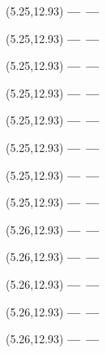 \documentclass[12pt,a4paper]{article}
\begin{document}
\begin{textblock}{3}(5.25,12.93)
{\bf ---}\quad\quad\ {\bf ---}
\end{textblock}
\newpage

\begin{textblock}{3}(5.25,12.93)
{\bf ---}\quad\quad\ {\bf ---}
\end{textblock}
\newpage

\begin{textblock}{3}(5.25,12.93)
{\bf ---}\quad\quad\ {\bf ---}
\end{textblock}
\newpage

\begin{textblock}{3}(5.25,12.93)
{\bf ---}\quad\quad\ {\bf ---}
\end{textblock}
\newpage

\begin{textblock}{3}(5.25,12.93)
{\bf ---}\quad\quad\ {\bf ---}
\end{textblock}
\newpage

\begin{textblock}{3}(5.25,12.93)
{\bf ---}\quad\quad\ {\bf ---}
\end{textblock}
\newpage

\begin{textblock}{3}(5.25,12.93)
{\bf ---}\quad\quad\ {\bf ---}
\end{textblock}
\newpage

\begin{textblock}{3}(5.25,12.93)
{\bf ---}\quad\quad\ {\bf ---}
\end{textblock}
\newpage

\begin{textblock}{3}(5.26,12.93)
{\bf ---}\quad\quad\ {\bf ---}
\end{textblock}
\newpage

\begin{textblock}{3}(5.26,12.93)
{\bf ---}\quad\quad\ {\bf ---}
\end{textblock}
\newpage

\begin{textblock}{3}(5.26,12.93)
{\bf ---}\quad\quad\ {\bf ---}
\end{textblock}
\newpage

\begin{textblock}{3}(5.26,12.93)
{\bf ---}\quad\quad\ {\bf ---}
\end{textblock}
\newpage

\begin{textblock}{3}(5.26,12.93)
{\bf ---}\quad\quad\ {\bf ---}
\end{textblock}
\newpage
\end{document}
